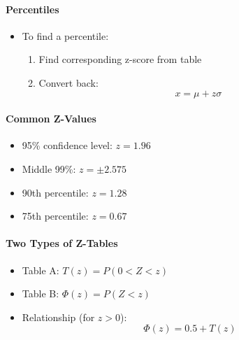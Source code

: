 \documentclass{article}
\begin{document}
\paragraph{Percentiles}

\begin{itemize}
    \item To find a percentile:
    \begin{enumerate}
        \item Find corresponding z-score from table
        \item Convert back:
        \[
        x = \mu + z\sigma
        \]
    \end{enumerate}
\end{itemize}

\paragraph{Common Z-Values}

\begin{itemize}
    \item 95\% confidence level: $z = 1.96$
    \item Middle 99\%: $z = \pm 2.575$
    \item 90th percentile: $z = 1.28$
    \item 75th percentile: $z = 0.67$
\end{itemize}

\paragraph{Two Types of Z-Tables}

\begin{itemize}
    \item Table A: $T(z) = P(0 < Z < z)$
    \item Table B: $\Phi(z) = P(Z < z)$
    \item Relationship (for $z > 0$):
    \[
    \Phi(z) = 0.5 + T(z)
    \]
\end{itemize}
\end{document}
